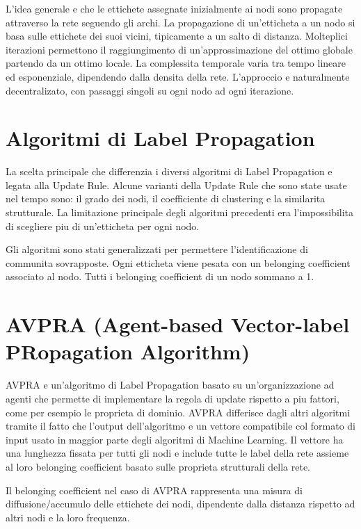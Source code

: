 \documentclass[a4paper,12pt]{report}
\begin{document}
	L'idea generale e che le ettichete assegnate inizialmente ai nodi sono propagate attraverso la rete seguendo gli archi. La propagazione di un'etticheta a un nodo si basa sulle ettichete dei suoi vicini, tipicamente a un salto di distanza. Molteplici iterazioni permettono il raggiungimento di un'approssimazione del ottimo globale partendo da un ottimo locale. La complessita temporale varia tra tempo lineare ed esponenziale, dipendendo dalla densita della rete. L'approccio e naturalmente decentralizato, con passaggi singoli su ogni nodo ad ogni iterazione. \cite{avpra}
	
	\section{Algoritmi di Label Propagation}
	La scelta principale che differenzia i diversi algoritmi di Label Propagation e legata alla Update Rule. Alcune varianti della Update Rule che sono state usate nel tempo sono: il grado dei nodi, il coefficiente di clustering e la similarita strutturale.
	La limitazione principale degli algoritmi precedenti era l'impossibilita di scegliere piu di un'etticheta per ogni nodo. \par	
	Gli algoritmi sono stati generalizzati per permettere l'identificazione di communita sovrapposte. Ogni etticheta viene pesata con un belonging coefficient associato al nodo. Tutti i belonging coefficient di un nodo sommano a 1. \par
	
	\section{AVPRA (Agent-based Vector-label PRopagation Algorithm)}
	AVPRA e un'algoritmo di Label Propagation basato su un'organizzazione ad agenti che permette di implementare la regola di update rispetto a piu fattori, come per esempio le proprieta di dominio. 
	AVPRA differisce dagli altri algoritmi tramite il fatto che l'output dell'algoritmo e un vettore compatibile col formato di input usato in maggior parte degli algoritmi di Machine Learning. Il vettore ha una lunghezza fissata per tutti gli nodi e include tutte le label della rete assieme al loro belonging coefficient basato sulle proprieta strutturali della rete. \par
	Il belonging coefficient nel caso di AVPRA rappresenta una misura di diffusione/accumulo delle ettichete dei nodi, dipendente dalla distanza rispetto ad altri nodi e la loro frequenza. \cite{avpra} \par
\end{document}
